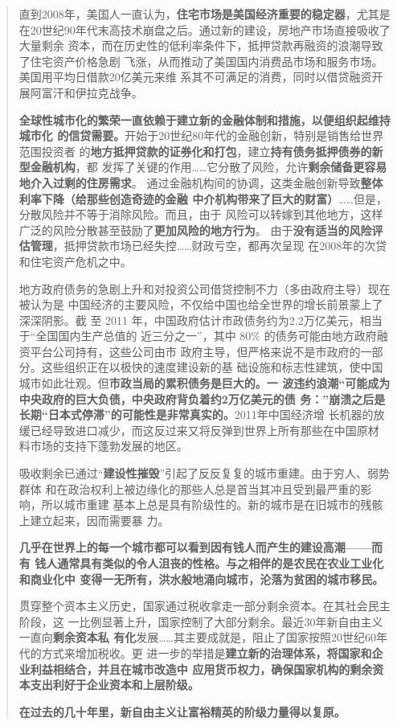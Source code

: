 \begin{quotation}
  直到2008年，美国人一直认为，\textbf{住宅市场是美国经济重要的稳定器}，尤其是
  在20世纪90年代末高技术崩盘之后。通过新的建设，房地产市场直接吸收了大量剩余
  资本，而在历史性的低利率条件下，抵押贷款再融资的浪潮导致了住宅资产价格急剧
  飞涨，从而推动了美国国内消费品市场和服务市场。美国用平均日借款20亿美元来维
  系其不可满足的消费，同时以借贷融资开展阿富汗和伊拉克战争。

  \textbf{全球性城市化的繁荣一直依赖于建立新的金融体制和措施，以便组织起维持城市化
    的信贷需要。}开始于20世纪80年代的金融创新，特别是销售给世界范围投资者
  的\textbf{地方抵押贷款的证券化和打包}，建立\textbf{持有债务抵押债券的新型金融机构}，都
  发挥了关键的作用……它分散了风险，允许\textbf{剩余储备更容易地介入过剩的住房需求}。
  通过金融机构间的协调，这类金融创新导致\textbf{整体利率下降（给那些创造奇迹的金融
    中介机构带来了巨大的财富）}……但是，分散风险并不等于消除风险。而且，由于
  风险可以转嫁到其他地方，这样广泛的风险分散甚至鼓励了\textbf{更加风险的地方行为}。
  由于\textbf{没有适当的风险评估管理}，抵押贷款市场已经失控……财政亏空，都再次呈现
  在2008年的次贷和住宅资产危机之中。

  地方政府债务的急剧上升和对投资公司借贷控制不力（多由政府主导）现在被认为是
  中国经济的主要风险，不仅给中国也给全世界的增长前景蒙上了深深阴影。截
  至 2011 年，中国政府估计市政债务约为2.2万亿美元，相当于“全国国内生产总值的
  近三分之一”，其中 80\% 的债务可能由地方政府融资平台公司持有，这些公司由市
  政府主导，但严格来说不是市政府的一部分。这些组织正在以极快的速度建设新的基
  础设施和标志性建筑，使中国城市如此壮观。但\textbf{市政当局的累积债务是巨大的。一
    波违约浪潮“可能成为中央政府的巨大负债，中央政府背负着约2万亿美元的债
    务：”崩溃之后是长期“日本式停滞”的可能性是非常真实的。}2011年中国经济增
  长机器的放缓已经导致进口减少，而这反过来又将反弹到世界上所有那些在中国原材
  料市场的支持下蓬勃发展的地区。

  吸收剩余已通过“\textbf{建设性摧毁}”引起了反反复复的城市重建。由于穷人、弱势群体
  和在政治权利上被边缘化的那些人总是首当其冲且受到最严重的影响，所以城市重建
  基本上总是具有阶级性的。新的城市是在旧城市的残骸上建立起来，因而需要暴
  力。

  \textbf{几乎在世界上的每一个城市都可以看到因有钱人而产生的建设高潮——而有
    钱人通常具有类似的令人沮丧的性格。与之相伴的是农民在农业工业化和商业化中
    变得一无所有，洪水般地涌向城市，沦落为贫困的城市移民。}

  贯穿整个资本主义历史，国家通过税收拿走一部分剩余资本。在其社会民主阶段，这
  一比例显著上升，国家控制了大部分剩余。最近30年新自由主义一直向\textbf{剩余资本私
    有化}发展……其主要成就是，阻止了国家按照20世纪60年代的方式来增加税收。更
  进一步的举措是\textbf{建立新的治理体系，将国家和企业利益相结合，并且在城市改造中
    应用货币权力，确保国家机构的剩余资本支出利好于企业资本和上层阶级。}

  \textbf{在过去的几十年里，新自由主义让富裕精英的阶级力量得以复原。}
\end{quotation}




